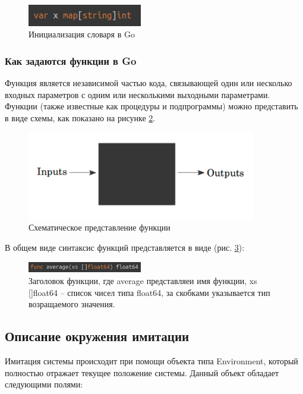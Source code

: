 \begin{figure}[!ht]
\centering
\includegraphics[width=5cm]{Kenenbek/images/go-map.png}
\caption{Инициализация словаря в Go}
\label{fig:go-map}
\end{figure}

\subsubsection{Как задаются функции в Go}

Функция является независимой частью кода, связывающей один или несколько входных параметров с одним или несколькими выходными параметрами. Функции (также известные как процедуры и подпрограммы) можно представить в виде схемы, как показано на рисунке \ref{fig:func}.

\begin{figure}[!ht]
\centering
\includegraphics[width=10cm]{Kenenbek/images/func.png}
\caption{Схематическое представление функции}
\label{fig:func}
\end{figure}

В общем виде синтаксис функций представляется в виде (рис. \ref{fig:func-body}):

\begin{figure}[!ht]
\centering
\includegraphics[width=5cm]{Kenenbek/images/func-body.png}
\caption{Заголовок функции, где average представляеи имя функции, xs []float64 -- список чисел типа float64, за скобками указывается тип возращаемого значения.}
\label{fig:func-body}
\end{figure}

\subsection{Описание окружения имитации}

Имитация системы происходит при помощи объекта типа Environment, который полностью отражает текущее положение системы. Данный объект обладает следующими полями:

